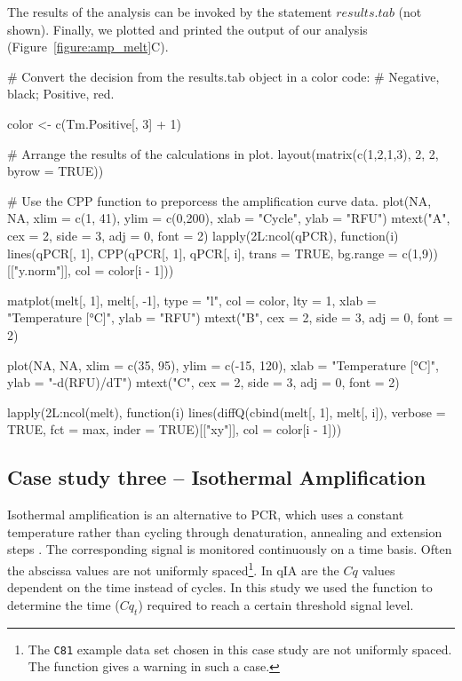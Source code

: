 The results of the analysis can be invoked by the statement $results.tab$ (not 
shown). Finally, we plotted and printed the output of our analysis 
(Figure~\ref{figure:amp_melt}C).

\begin{example}
# Convert the decision from the results.tab object in a color code:
# Negative, black; Positive, red.

color <- c(Tm.Positive[, 3] + 1)

# Arrange the results of the calculations in plot.
layout(matrix(c(1,2,1,3), 2, 2, byrow = TRUE))

# Use the CPP function to preporcess the amplification curve data.
plot(NA, NA, xlim = c(1, 41), ylim = c(0,200), xlab = "Cycle", ylab = "RFU")
mtext("A", cex = 2, side = 3, adj = 0, font = 2)
lapply(2L:ncol(qPCR), function(i) 
  lines(qPCR[, 1], 
        CPP(qPCR[, 1], qPCR[, i], trans = TRUE, 
            bg.range = c(1,9))[["y.norm"]],
        col = color[i - 1]))

matplot(melt[, 1], melt[, -1], type = "l", col = color, 
        lty = 1, xlab = "Temperature [°C]", ylab = "RFU")
mtext("B", cex = 2, side = 3, adj = 0, font = 2)

plot(NA, NA, xlim = c(35, 95), ylim = c(-15, 120), xlab = "Temperature [°C]", 
     ylab = "-d(RFU)/dT")
mtext("C", cex = 2, side = 3, adj = 0, font = 2)

lapply(2L:ncol(melt), function(i)
  lines(diffQ(cbind(melt[, 1], melt[, i]), verbose = TRUE, 
              fct = max, inder = TRUE)[["xy"]], col = color[i - 1]))
\end{example}

\subsection{Case study three -- Isothermal Amplification}
Isothermal amplification is an alternative to PCR, which uses a constant 
temperature rather than cycling through denaturation, annealing and extension 
steps \citep{rodiger_nucleic_2014}. The corresponding signal is monitored 
continuously on a time basis. Often the abscissa values are not uniformly 
spaced\footnote{The \texttt{C81} example data set chosen in this case study are 
not uniformly spaced. The  function gives a warning in such a case.}. 
In qIA are the $Cq$ values dependent on the time instead of cycles. In this 
study we used the  function to determine the time ($Cq_{t}$) 
required to reach a certain threshold signal level.

